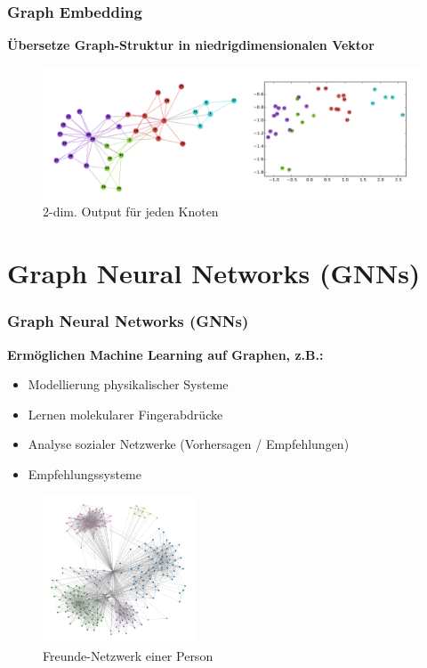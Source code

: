 \documentclass{beamer}
\begin{document}
\begin{frame}
  \frametitle{Graph Embedding}
  \textbf{Übersetze Graph-Struktur in niedrigdimensionalen Vektor}
  \begin{figure}
    \centering
    \includegraphics[width=\textwidth]{img/graph_embedding.png}
    \caption*{2-dim. Output für jeden Knoten \cite{Perozzi_2014}}
  \end{figure}
\end{frame}

\section{Graph Neural Networks (GNNs)}

\begin{frame}
  \frametitle{Graph Neural Networks (GNNs)}
  \textbf{Ermöglichen Machine Learning auf Graphen, z.B.:}
  \begin{itemize}
    \item Modellierung physikalischer Systeme
    \item Lernen molekularer Fingerabdrücke
    \item Analyse sozialer Netzwerke (Vorhersagen / Empfehlungen)
    \item Empfehlungssysteme
  \end{itemize}
  \begin{figure}
    \centering
    \includegraphics[width=0.4\textwidth]{img/social_graph.png}
    \caption*{Freunde-Netzwerk einer Person \cite{Facebook}}
  \end{figure}
\end{frame}
\end{document}
